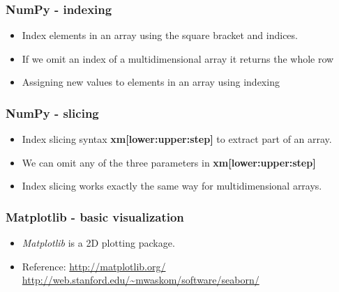 \documentclass[11pt]{beamer}
\begin{document}
%
\begin{frame}[plain]
    \frametitle{NumPy - indexing}
    \begin{itemize}
        \item[] Index elements in an array using the square bracket and indices. 
        
        \pause
        
        \pause
        \item[] If we omit an index of a multidimensional array it returns the whole row
        
        \pause
        \item[] Assigning new values to elements in an array using indexing
        
    \end{itemize}
\end{frame}
%
\begin{frame}[plain]
    \frametitle{NumPy - slicing}
    \begin{itemize}
        \item[] Index slicing syntax \textbf{xm[lower:upper:step]} to extract part of an array. 
        
        \pause
        \item[] We can omit any of the three parameters in \textbf{xm[lower:upper:step]}
        
        \pause 
        \item[] Index slicing works exactly the same way for multidimensional arrays.
        
    \end{itemize}
\end{frame}
%
\begin{frame}[plain]
    \frametitle{Matplotlib - basic visualization}
    \begin{itemize}
        \item[] \textit{Matplotlib} is a 2D plotting package.  
        \pause
        
        \pause
        
        \pause
        \item[] Reference: \url{http://matplotlib.org/}\\
        \url{http://web.stanford.edu/~mwaskom/software/seaborn/}
    \end{itemize}
\end{frame}
%
\end{document}
